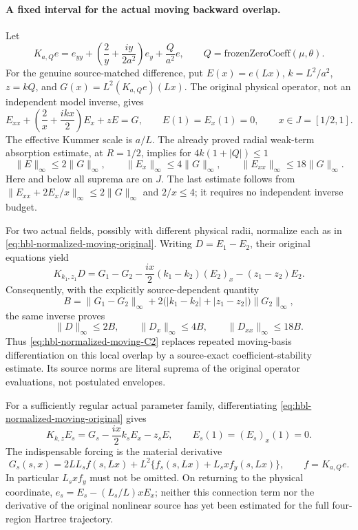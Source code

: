 \documentclass[11pt]{amsart}
\begin{document}
\paragraph{A fixed interval for the actual moving backward overlap.}
Let
\[
 K_{a,Q}e=e_{yy}+\left(\frac2y+\frac{iy}{2a^2}\right)e_y
              +\frac{Q}{a^2}e,
 \qquad Q=\mathrm{frozenZeroCoeff}(\mu,\theta).
\]
For the genuine source-matched difference, put
\(E(x)=e(Lx)\), \(k=L^2/a^2\), \(z=kQ\), and
\(G(x)=L^2(K_{a,Q}e)(Lx)\).  The original physical
operator, not an independent model inverse, gives
\begin{equation}
 E_{xx}+\left(\frac2x+\frac{ikx}{2}\right)E_x+zE=G,
 \qquad E(1)=E_x(1)=0,
 \qquad x\in J=[1/2,1].
 \label{eq:hbl-normalized-moving-original}
\end{equation}
The effective Kummer scale is \(a/L\).  The already proved radial
weak-term absorption estimate, at \(R=1/2\), implies for
\(4k(1+|Q|)\le1\)
\[
 \|E\|_\infty\le2\|G\|_\infty,\qquad
 \|E_x\|_\infty\le4\|G\|_\infty,\qquad
 \|E_{xx}\|_\infty\le18\|G\|_\infty.
\]
Here and below all suprema are on \(J\).  The last estimate follows
from \(\|E_{xx}+2E_x/x\|_\infty\le2\|G\|_\infty\) and
\(2/x\le4\); it requires no independent inverse budget.

For two actual fields, possibly with different physical radii,
normalize each as in \eqref{eq:hbl-normalized-moving-original}.
Writing \(D=E_1-E_2\), their original equations yield
\[
 K_{k_1,z_1}D
 =G_1-G_2-\frac{ix}{2}(k_1-k_2)(E_2)_x-(z_1-z_2)E_2.
\]
Consequently, with the explicitly source-dependent quantity
\[
 B=\|G_1-G_2\|_\infty+
       2\bigl(|k_1-k_2|+|z_1-z_2|\bigr)\|G_2\|_\infty,
\]
the same inverse proves
\begin{equation}
 \|D\|_\infty\le2B,\qquad
 \|D_x\|_\infty\le4B,\qquad
 \|D_{xx}\|_\infty\le18B.
 \label{eq:hbl-normalized-moving-C2}
\end{equation}
Thus \eqref{eq:hbl-normalized-moving-C2} replaces repeated
moving-basis differentiation on this local overlap by a source-exact
coefficient-stability estimate.  Its source norms are literal suprema
of the original operator evaluations, not postulated envelopes.

For a sufficiently regular actual parameter family, differentiating
\eqref{eq:hbl-normalized-moving-original} gives
\[
 K_{k,z}E_s=G_s-\frac{ix}{2}k_sE_x-z_sE,
 \qquad E_s(1)=(E_s)_x(1)=0.
\]
The indispensable forcing is the material derivative
\[
 G_s(s,x)=2LL_sf(s,Lx)+L^2\{f_s(s,Lx)+L_sxf_y(s,Lx)\},
 \qquad f=K_{a,Q}e.
\]
In particular \(L_sxf_y\) must not be omitted.  On returning to the
physical coordinate, \(e_s=E_s-(L_s/L)xE_x\); neither this connection
term nor the derivative of the original nonlinear source has yet been
estimated for the full four-region Hartree trajectory.
\end{document}
